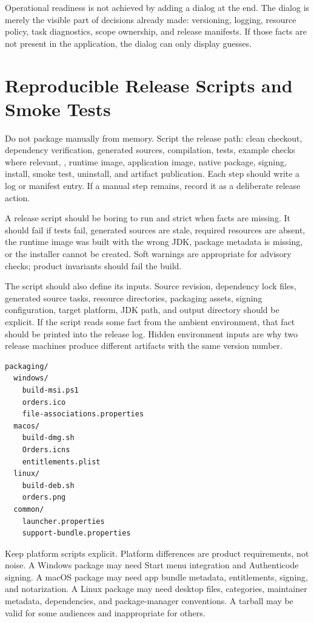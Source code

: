 Operational readiness is not achieved by adding a dialog at the end. The dialog is merely the visible part of decisions already made: versioning, logging, resource policy, task diagnostics, scope ownership, and release manifests. If those facts are not present in the application, the dialog can only display guesses.

\section{Reproducible Release Scripts and Smoke Tests}

Do not package manually from memory. Script the release path: clean checkout, dependency verification, generated sources, compilation, tests, example checks where relevant, , runtime image, application image, native package, signing, install, smoke test, uninstall, and artifact publication. Each step should write a log or manifest entry. If a manual step remains, record it as a deliberate release action.

A release script should be boring to run and strict when facts are missing. It should fail if tests fail, generated sources are stale, required resources are absent, the runtime image was built with the wrong JDK, package metadata is missing, or the installer cannot be created. Soft warnings are appropriate for advisory checks; product invariants should fail the build.

The script should also define its inputs. Source revision, dependency lock files, generated source tasks, resource directories, packaging assets, signing configuration, target platform, JDK path, and output directory should be explicit. If the script reads some fact from the ambient environment, that fact should be printed into the release log. Hidden environment inputs are why two release machines produce different artifacts with the same version number.

\begin{lstlisting}[language=sh,caption={A packaging asset layout with explicit platform directories.}]
packaging/
  windows/
    build-msi.ps1
    orders.ico
    file-associations.properties
  macos/
    build-dmg.sh
    Orders.icns
    entitlements.plist
  linux/
    build-deb.sh
    orders.png
  common/
    launcher.properties
    support-bundle.properties
\end{lstlisting}

Keep platform scripts explicit. Platform differences are product requirements, not noise. A Windows package may need Start menu integration and Authenticode signing. A macOS package may need app bundle metadata, entitlements, signing, and notarization. A Linux package may need desktop files, categories, maintainer metadata, dependencies, and package-manager conventions. A tarball may be valid for some audiences and inappropriate for others.

